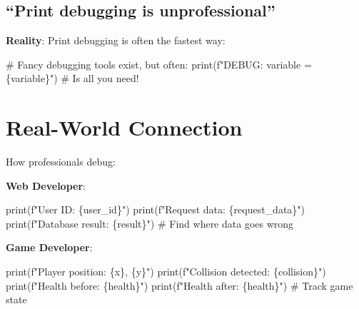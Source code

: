\documentclass[
  letterpaper,
  DIV=11,
  numbers=noendperiod,
  oneside]{scrreprt}
\newenvironment{Shaded}{}{}
\newcommand{\BuiltInTok}[1]{\textcolor[rgb]{0.84,0.23,0.29}{#1}}
\newcommand{\CommentTok}[1]{\textcolor[rgb]{0.42,0.45,0.49}{#1}}
\newcommand{\NormalTok}[1]{\textcolor[rgb]{0.14,0.16,0.18}{#1}}
\newcommand{\SpecialCharTok}[1]{\textcolor[rgb]{0.00,0.36,0.77}{#1}}
\newcommand{\SpecialStringTok}[1]{\textcolor[rgb]{0.01,0.18,0.38}{#1}}
\begin{document}
\subsection{``Print debugging is
unprofessional''}\label{print-debugging-is-unprofessional}

\textbf{Reality}: Print debugging is often the fastest way:

\begin{Shaded}
\begin{Highlighting}[]
\CommentTok{\# Fancy debugging tools exist, but often:}
\BuiltInTok{print}\NormalTok{(}\SpecialStringTok{f"DEBUG: variable = }\SpecialCharTok{\{}\NormalTok{variable}\SpecialCharTok{\}}\SpecialStringTok{"}\NormalTok{)}
\CommentTok{\# Is all you need!}
\end{Highlighting}
\end{Shaded}

\section{Real-World Connection}\label{real-world-connection-8}

How professionals debug:

\textbf{Web Developer}:

\begin{Shaded}
\begin{Highlighting}[]
\BuiltInTok{print}\NormalTok{(}\SpecialStringTok{f"User ID: }\SpecialCharTok{\{}\NormalTok{user\_id}\SpecialCharTok{\}}\SpecialStringTok{"}\NormalTok{)}
\BuiltInTok{print}\NormalTok{(}\SpecialStringTok{f"Request data: }\SpecialCharTok{\{}\NormalTok{request\_data}\SpecialCharTok{\}}\SpecialStringTok{"}\NormalTok{)}
\BuiltInTok{print}\NormalTok{(}\SpecialStringTok{f"Database result: }\SpecialCharTok{\{}\NormalTok{result}\SpecialCharTok{\}}\SpecialStringTok{"}\NormalTok{)}
\CommentTok{\# Find where data goes wrong}
\end{Highlighting}
\end{Shaded}

\textbf{Game Developer}:

\begin{Shaded}
\begin{Highlighting}[]
\BuiltInTok{print}\NormalTok{(}\SpecialStringTok{f"Player position: }\SpecialCharTok{\{}\NormalTok{x}\SpecialCharTok{\}}\SpecialStringTok{, }\SpecialCharTok{\{}\NormalTok{y}\SpecialCharTok{\}}\SpecialStringTok{"}\NormalTok{)}
\BuiltInTok{print}\NormalTok{(}\SpecialStringTok{f"Collision detected: }\SpecialCharTok{\{}\NormalTok{collision}\SpecialCharTok{\}}\SpecialStringTok{"}\NormalTok{)}
\BuiltInTok{print}\NormalTok{(}\SpecialStringTok{f"Health before: }\SpecialCharTok{\{}\NormalTok{health}\SpecialCharTok{\}}\SpecialStringTok{"}\NormalTok{)}
\BuiltInTok{print}\NormalTok{(}\SpecialStringTok{f"Health after: }\SpecialCharTok{\{}\NormalTok{health}\SpecialCharTok{\}}\SpecialStringTok{"}\NormalTok{)}
\CommentTok{\# Track game state}
\end{Highlighting}
\end{Shaded}
\end{document}
